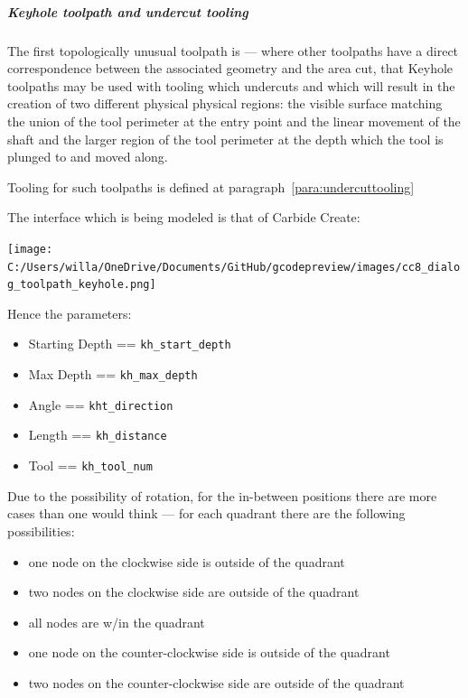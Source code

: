\documentclass{ltxdoc}
\begin{document}
\subparagraph{Keyhole toolpath and undercut tooling}
 
\label{subsec:keyholetoolpaths}
The first topologically unusual toolpath is  --- where other toolpaths have a direct correspondence between the associated geometry and the area cut, that Keyhole toolpaths may be used with tooling which undercuts and which will result in the creation of two different physical physical regions: the visible surface matching the union of the tool perimeter at the entry point and the linear movement of the shaft and the larger region of the tool perimeter at the depth which the tool is plunged to and moved along.
 
Tooling for such toolpaths is defined at paragraph~\ref{para:undercuttooling}

The interface which is being modeled is that of Carbide Create:

\bigskip

\begin{centering}
\texttt{[image: C:/Users/willa/OneDrive/Documents/GitHub/gcodepreview/images/cc8\_dialog\_toolpath\_keyhole.png]}\par
\end{centering}

\bigskip

\noindent Hence the parameters:

\begin{itemize}
\item Starting Depth == \verb|kh_start_depth|
\item Max Depth == \verb|kh_max_depth|
\item Angle == \verb|kht_direction|
\item Length == \verb|kh_distance|
\item Tool == \verb|kh_tool_num|
\end{itemize}

Due to the possibility of rotation, for the in-between positions there are more cases than one would think --- for each quadrant there are the following possibilities:

\begin{itemize}
 \item one node on the clockwise side is outside of the quadrant
 \item two nodes on the clockwise side are outside of the quadrant
 \item all nodes are w/in the quadrant
 \item one node on the counter-clockwise side is outside of the quadrant
 \item two nodes on the counter-clockwise side are outside of the quadrant
\end{itemize}
 
\end{document}
